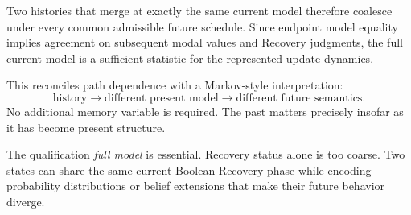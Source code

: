 Two histories that merge at exactly the same current model therefore coalesce under every common admissible future schedule. Since endpoint model equality implies agreement on subsequent modal values and Recovery judgments, the full current model is a sufficient statistic for the represented update dynamics.

This reconciles path dependence with a Markov-style interpretation:
\[
\text{history}
\longrightarrow
\text{different present model}
\longrightarrow
\text{different future semantics}.
\]
No additional memory variable is required. The past matters precisely insofar as it has become present structure.

The qualification \emph{full model} is essential. Recovery status alone is too coarse. Two states can share the same current Boolean Recovery phase while encoding probability distributions or belief extensions that make their future behavior diverge.
